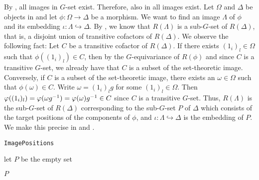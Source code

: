 \begin{rem}
By , all images in $G$-set exist. Therefore, also in \SkeletalGSets{} all images exist. Let $\Omega$ and $\Delta$ be objects in \SkeletalGSets{} and let $\phi\colon \Omega \to \Delta$ be a morphism. We want to find an image $\Lambda$ of $\phi$ and its embedding $\iota\colon \Lambda \hookrightarrow \Delta$. By , we know that $R(\Lambda)$ is a sub-$G$-set of $R(\Delta)$, that is, a disjoint union of transitive cofactors of $R(\Delta)$. We observe the following fact: Let $C$ be a transitive cofactor of $R(\Delta)$. If there exists $(1_i)_l \in \Omega$ such that $\phi((1_i)_l) \in C$, then by the $G$-equivariance of $R(\phi)$ and since $C$ is a transitive $G$-set, we already have that $C$ is a subset of the set-theoretic image. Conversely, if $C$ is a subset of the set-theoretic image, there exists an $\omega \in \Omega$ such that $\phi(\omega) \in C$. Write $\omega = (1_i)_lg$ for some $(1_i)_l \in \Omega$. Then $\varphi((1_i)_l) = \varphi(\omega g^{-1}) = \varphi(\omega)g^{-1} \in C$ since $C$ is a transitive $G$-set. Thus, $R(\Lambda)$ is the sub-$G$-set of $R(\Delta)$ corresponding to the sub-$G$-set $P$ of $\Delta$ which consists of the target positions of the components of $\phi$, and $\iota\colon \Lambda \hookrightarrow \Delta$ is the embedding of $P$. We make this precise in  and .
\end{rem}

\begin{algorithm}\capstart
    \caption{\texttt{ImagePositions}}\label{algo:ImagePositions}
	\BlankLine
	let $P$ be the empty set\;
	
	\Return $P$\;
\end{algorithm}

